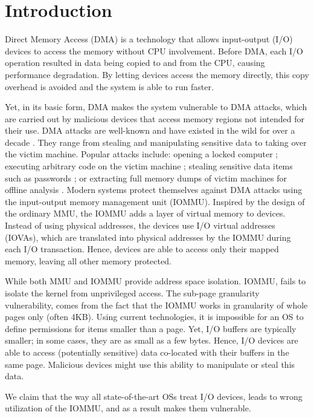 \section{Introduction}

Direct Memory Access (DMA) is a technology that allows input-output (I/O) devices to access the memory without CPU involvement. Before DMA, each I/O operation resulted in data being copied to and from the CPU, causing performance degradation. By letting devices access the memory directly, this copy overhead is avoided and the system is able to run faster. 

Yet, in its basic form, DMA makes the system vulnerable to DMA attacks, which are carried out by malicious devices that access memory regions not intended for their use. DMA attacks are well-known and have existed in the wild for over a decade \cite{Dor04,BDK10,thunder}. They range from stealing and manipulating sensitive data to taking over the victim machine. Popular attacks include: opening a locked computer \cite{MM, Fin14}; executing arbitrary code on the victim machine \cite{Fri16, Woj08, AD10,thunder}; stealing sensitive data items such as passwords \cite{SB12, LKV13, Cim16, BR12}; or extracting full memory dumps of victim machines for offline analysis \cite{MM, Vol, Fin14, GA10}. Modern systems protect themselves against DMA attacks using the input-output memory management unit (IOMMU). Inspired by the design of the ordinary MMU, the IOMMU adds a layer of virtual memory to devices. Instead of using physical addresses, the devices use I/O virtual addresses (IOVAs), which are translated into physical addresses by the IOMMU during each I/O transaction. Hence, devices are able to access only their mapped memory, leaving all other memory protected.

While both MMU and IOMMU provide address space isolation. IOMMU, fails to isolate the kernel from unprivileged access. The sub-page granularity vulnerability, comes from the fact that the IOMMU works in granularity of whole pages only (often 4KB). Using current technologies, it is impossible for an OS to define permissions for items smaller than a page. Yet, I/O buffers are typically smaller; in some cases, they are as small as a few bytes. Hence, I/O devices are able to access (potentially sensitive) data co-located with their buffers in the same page. Malicious devices might use this ability to manipulate or steal this data.

We claim that the way all state-of-the-art OSs treat I/O devices, leads to wrong utilization of the IOMMU, and as a result makes them vulnerable.

